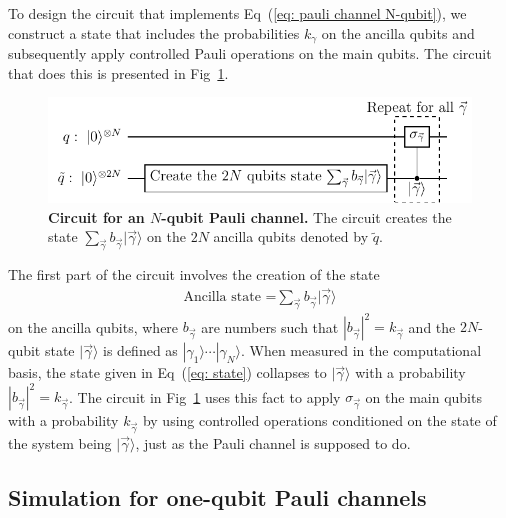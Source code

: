 \documentclass[10pt,letterpaper]{article} %
\newcommand{\fref}[1]{Fig~\ref{#1}}
\newcommand{\eref}[1]{Eq~(\ref{#1})}
\begin{document}
To design the circuit that implements \eref{eq: pauli channel N-qubit}, we construct a state that 
includes the probabilities $k_{\gamma}$ on the ancilla qubits and subsequently
apply controlled Pauli operations on the main qubits.  The circuit that does
this is presented in \fref{Fig1}. 


\begin{figure}[htb] %
\centering
\includegraphics{circuito_general.pdf}
\caption{{\bf Circuit for an $N$-qubit
Pauli channel.}
The circuit creates the state $\sum_{\vec{\gamma}} b_{\vec{\gamma}}|\vec{\gamma}\rangle$ 
on the $2N$ ancilla qubits denoted by $\tilde{q}$.}
\label{Fig1}
\end{figure} %

The first part of the circuit involves the creation of the state
\begin{eqnarray}
\label{eq: state}
\text{Ancilla state =} 
\sum_{\vec{\gamma}} b_{\vec{\gamma}} |\vec{\gamma} \rangle
\end{eqnarray}
on the ancilla qubits, where $b_{\vec{\gamma}}$ are numbers such that $
{|b_{\vec{\gamma}}|}^2 = k_{\vec{\gamma}}$ and
the $2N$-qubit state $|\vec{\gamma}\rangle$ is defined as $|\gamma_1\rangle
\cdots |\gamma_N\rangle$.
When measured in the computational basis, the state given in \eref{eq: state}
collapses to $|\vec{\gamma}\rangle$ with a 
probability ${|b_{\vec{\gamma}}|}^2 = k_{\vec\gamma}$. 
The circuit in \fref{Fig1} uses this fact
to apply $\sigma_{\vec{\gamma}}$ on the main qubits
with a probability $k_{\vec\gamma}$ by using controlled operations 
conditioned on the state of the system being $|\vec{\gamma}\rangle$,
just as the Pauli channel is supposed to do.  

\subsection{Simulation for one-qubit Pauli channels} %
\label{subsec: Simulation for one-qubit Pauli channels}
\end{document}
